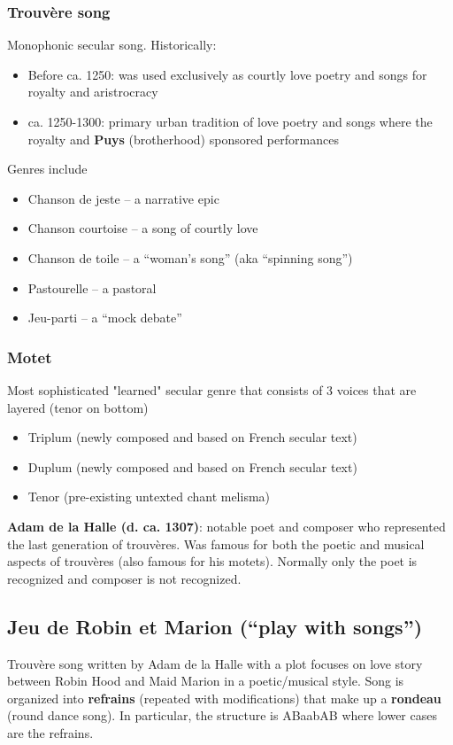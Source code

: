 \documentclass{article}
\begin{document}
  \subsubsection{Trouvère song}
  Monophonic secular song. Historically:
  \begin{itemize}
    \item Before ca. 1250: was used exclusively as courtly love poetry and songs for royalty and aristrocracy
    \item ca. 1250-1300: primary urban tradition of love poetry and songs where the royalty and \textbf{Puys} (brotherhood) sponsored performances
  \end{itemize}
  Genres include
  \begin{itemize}
    \item Chanson de jeste – a narrative epic
    \item Chanson courtoise – a song of courtly love
    \item Chanson de toile – a “woman’s song” (aka “spinning song”)
    \item Pastourelle – a pastoral
    \item Jeu-parti – a “mock debate”
  \end{itemize}
  \subsubsection{Motet}
  Most sophisticated "learned" secular genre that consists of 3 voices that are layered (tenor on bottom)
  \begin{itemize}
    \item Triplum (newly composed and based on French secular text)
    \item Duplum (newly composed and based on French secular text)
    \item Tenor (pre-existing untexted chant melisma)
  \end{itemize}
  \textbf{Adam de la Halle (d. ca. 1307)}: notable poet and composer who represented the last generation of trouvères. Was famous for both the poetic and musical aspects of trouvères (also famous for his motets). Normally only the poet is recognized and composer is not recognized.
  \subsection{Jeu de Robin et Marion (“play with songs”)}
  Trouvère song written by Adam de la Halle with a plot focuses on love story between Robin Hood and Maid Marion in a poetic/musical style. Song is organized into \textbf{refrains} (repeated with modifications) that make up a \textbf{rondeau} (round dance song). In particular, the structure is ABaabAB where lower cases are the refrains.
\end{document}
